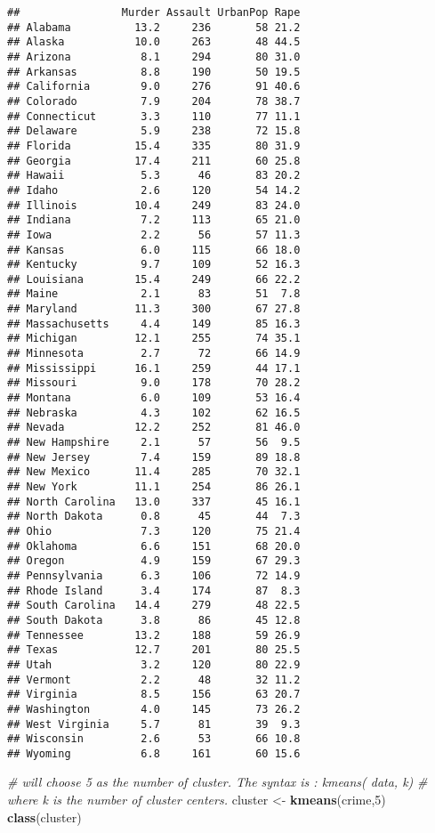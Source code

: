 \documentclass[]{article}
\newenvironment{Shaded}{\begin{snugshade}}{\end{snugshade}}
\newcommand{\KeywordTok}[1]{\textcolor[rgb]{0.13,0.29,0.53}{\textbf{#1}}}
\newcommand{\DecValTok}[1]{\textcolor[rgb]{0.00,0.00,0.81}{#1}}
\newcommand{\StringTok}[1]{\textcolor[rgb]{0.31,0.60,0.02}{#1}}
\newcommand{\CommentTok}[1]{\textcolor[rgb]{0.56,0.35,0.01}{\textit{#1}}}
\newcommand{\NormalTok}[1]{#1}
\begin{document}
\begin{verbatim}
##                Murder Assault UrbanPop Rape
## Alabama          13.2     236       58 21.2
## Alaska           10.0     263       48 44.5
## Arizona           8.1     294       80 31.0
## Arkansas          8.8     190       50 19.5
## California        9.0     276       91 40.6
## Colorado          7.9     204       78 38.7
## Connecticut       3.3     110       77 11.1
## Delaware          5.9     238       72 15.8
## Florida          15.4     335       80 31.9
## Georgia          17.4     211       60 25.8
## Hawaii            5.3      46       83 20.2
## Idaho             2.6     120       54 14.2
## Illinois         10.4     249       83 24.0
## Indiana           7.2     113       65 21.0
## Iowa              2.2      56       57 11.3
## Kansas            6.0     115       66 18.0
## Kentucky          9.7     109       52 16.3
## Louisiana        15.4     249       66 22.2
## Maine             2.1      83       51  7.8
## Maryland         11.3     300       67 27.8
## Massachusetts     4.4     149       85 16.3
## Michigan         12.1     255       74 35.1
## Minnesota         2.7      72       66 14.9
## Mississippi      16.1     259       44 17.1
## Missouri          9.0     178       70 28.2
## Montana           6.0     109       53 16.4
## Nebraska          4.3     102       62 16.5
## Nevada           12.2     252       81 46.0
## New Hampshire     2.1      57       56  9.5
## New Jersey        7.4     159       89 18.8
## New Mexico       11.4     285       70 32.1
## New York         11.1     254       86 26.1
## North Carolina   13.0     337       45 16.1
## North Dakota      0.8      45       44  7.3
## Ohio              7.3     120       75 21.4
## Oklahoma          6.6     151       68 20.0
## Oregon            4.9     159       67 29.3
## Pennsylvania      6.3     106       72 14.9
## Rhode Island      3.4     174       87  8.3
## South Carolina   14.4     279       48 22.5
## South Dakota      3.8      86       45 12.8
## Tennessee        13.2     188       59 26.9
## Texas            12.7     201       80 25.5
## Utah              3.2     120       80 22.9
## Vermont           2.2      48       32 11.2
## Virginia          8.5     156       63 20.7
## Washington        4.0     145       73 26.2
## West Virginia     5.7      81       39  9.3
## Wisconsin         2.6      53       66 10.8
## Wyoming           6.8     161       60 15.6
\end{verbatim}

\begin{Shaded}
\begin{Highlighting}[]
\CommentTok{# will choose 5 as the number of cluster. The syntax is : kmeans( data, k) }
\CommentTok{# where k is the number of cluster centers.}
\NormalTok{cluster <-}\StringTok{ }\KeywordTok{kmeans}\NormalTok{(crime,}\DecValTok{5}\NormalTok{)}
\KeywordTok{class}\NormalTok{(cluster)}
\end{Highlighting}
\end{Shaded}
\end{document}
